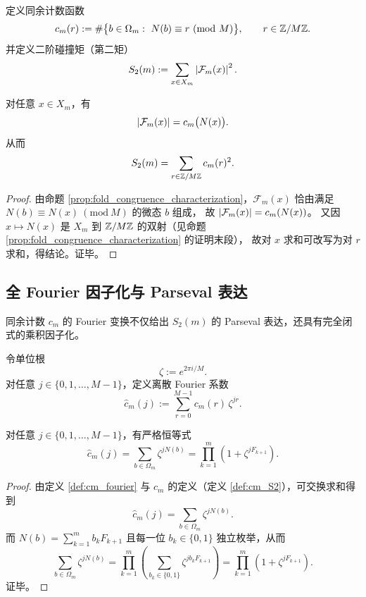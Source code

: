 \begin{definition}[同余计数与二阶碰撞矩]\label{def:cm_S2}
\MathTag
定义同余计数函数
$$
c_m(r):=\#\bigl\{b\in\Omega_m:\ N(b)\equiv r\ (\mathrm{mod}\ M)\bigr\},
\qquad r\in\ZZ/M\ZZ.
$$
并定义二阶碰撞矩（第二矩）
$$
S_2(m):=\sum_{x\in X_m}\left\lvert \mathcal F_m(x)\right\rvert^2.
$$
\end{definition}

\begin{corollary}[纤维谱的同余重标记]\label{cor:fiber_spectrum_as_congruence_counts}
\MathTag
对任意 $x\in X_m$，有
$$
\left\lvert \mathcal F_m(x)\right\rvert=c_m\bigl(N(x)\bigr).
$$
从而
$$
S_2(m)=\sum_{r\in\mathbb{Z}/M\mathbb{Z}} c_m(r)^2.
$$
\end{corollary}

\begin{proof}
\MathTag
由命题 \ref{prop:fold_congruence_characterization}，$\mathcal F_m(x)$ 恰由满足 $N(b)\equiv N(x)\ (\mathrm{mod}\ M)$ 的微态 $b$ 组成，
故 $\left\lvert \mathcal F_m(x)\right\rvert=c_m(N(x))$。
又因 $x\mapsto N(x)$ 是 $X_m$ 到 $\mathbb{Z}/M\mathbb{Z}$ 的双射（见命题 \ref{prop:fold_congruence_characterization} 的证明末段），
故对 $x$ 求和可改写为对 $r$ 求和，得结论。证毕。
\end{proof}

\subsection{全 Fourier 因子化与 Parseval 表达}
\MathTag
同余计数 $c_m$ 的 Fourier 变换不仅给出 $S_2(m)$ 的 Parseval 表达，还具有完全闭式的乘积因子化。

\begin{definition}[离散 Fourier 系数]\label{def:cm_fourier}
\MathTag
令单位根
$$
\zeta:=e^{2\pi i/M}.
$$
对任意 $j\in\{0,1,\dots,M-1\}$，定义离散 Fourier 系数
$$
\widehat c_m(j):=\sum_{r=0}^{M-1} c_m(r)\,\zeta^{jr}.
$$
\end{definition}

\begin{lemma}\label{lem:cm_fourier_factorization}
\MathTag
对任意 $j\in\{0,1,\dots,M-1\}$，有严格恒等式
$$
\widehat c_m(j)=\sum_{b\in\Omega_m}\zeta^{jN(b)}
=\prod_{k=1}^{m}\left(1+\zeta^{jF_{k+1}}\right).
$$
\end{lemma}

\begin{proof}
\MathTag
由定义 \ref{def:cm_fourier} 与 $c_m$ 的定义（定义 \ref{def:cm_S2}），可交换求和得到
$$
\widehat c_m(j)=\sum_{b\in\Omega_m}\zeta^{jN(b)}.
$$
而
$
N(b)=\sum_{k=1}^{m} b_k F_{k+1}
$
且每一位 $b_k\in\{0,1\}$ 独立枚举，从而
$$
\sum_{b\in\Omega_m}\zeta^{jN(b)}
=\prod_{k=1}^{m}\left(\sum_{b_k\in\{0,1\}}\zeta^{j b_k F_{k+1}}\right)
=\prod_{k=1}^{m}\left(1+\zeta^{jF_{k+1}}\right).
$$
证毕。
\end{proof}


